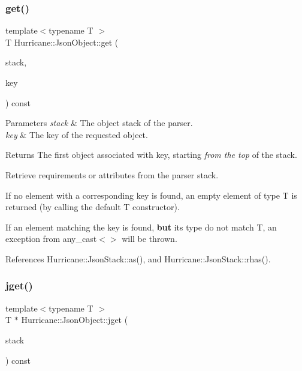 \subsubsection{\texorpdfstring{get()}{get()}}
{\footnotesize\ttfamily template$<$typename T $>$ \\
T Hurricane\+::\+Json\+Object\+::get (\begin{DoxyParamCaption}\item[{\hyperlink{classHurricane_1_1JsonStack}{Json\+Stack} \&}]{stack,  }\item[{const std\+::string \&}]{key }\end{DoxyParamCaption}) const\hspace{0.3cm}{\ttfamily [inline]}}


\begin{DoxyParams}{Parameters}
{\em stack} & The object stack of the parser. \\
\hline
{\em key} & The key of the requested object. \\
\hline
\end{DoxyParams}
\begin{DoxyReturn}{Returns}
The first object associated with {\ttfamily key}, starting {\itshape from the top} of the stack.
\end{DoxyReturn}
Retrieve requirements or attributes from the parser stack.
\begin{DoxyItemize}
\item If no element with a corresponding key is found, an empty element of type {\ttfamily T} is returned (by calling the default {\ttfamily T} constructor).
\item If an element matching the key is found, {\bfseries but} it\textquotesingle{}s type do not match {\ttfamily T}, an exception from {\ttfamily any\+\_\+cast$<$$>$} will be thrown. 
\end{DoxyItemize}

References Hurricane\+::\+Json\+Stack\+::as(), and Hurricane\+::\+Json\+Stack\+::rhas().

\mbox{\label{classHurricane_1_1JsonObject_a7a3fe903ceb00a3ebff66d1696edf682}} 
\subsubsection{\texorpdfstring{jget()}{jget()}}
{\footnotesize\ttfamily template$<$typename T $>$ \\
T $\ast$ Hurricane\+::\+Json\+Object\+::jget (\begin{DoxyParamCaption}\item[{\hyperlink{classHurricane_1_1JsonStack}{Json\+Stack} \&}]{stack }\end{DoxyParamCaption}) const\hspace{0.3cm}{\ttfamily [inline]}}


